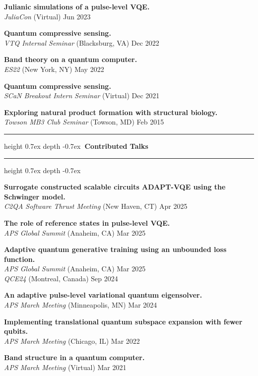 \documentclass[marginmode, 10pt]{res} %
\def\Vhrulefill{\leavevmode\leaders\hrule height 0.7ex depth \dimexpr0.4pt-0.7ex\hfill\kern0pt}         %
\begin{document}
\begin{resume}
\textbf{Julianic simulations of a pulse-level VQE.} \\
    \textit{JuliaCon} (Virtual) \hfill Jun 2023

\textbf{Quantum compressive sensing.} \\
    \textit{VTQ Internal Seminar} (Blacksburg, VA) \hfill Dec 2022

\textbf{Band theory on a quantum computer.} \\
    \textit{ES22} (New York, NY) \hfill May 2022

\textbf{Quantum compressive sensing.} \\
    \textit{SCaN Breakout Intern Seminar} (Virtual) \hfill Dec 2021

\textbf{Exploring natural product formation with structural biology.} \\
    \textit{Towson MB3 Club Seminar} (Towson, MD) \hfill Feb 2015



\Vhrulefill \textbf{~Contributed Talks~} \Vhrulefill

\textbf{Surrogate constructed scalable circuits ADAPT-VQE using the Schwinger model.} \\
    \textit{C2QA Software Thrust Meeting} (New Haven, CT) \hfill Apr 2025

\textbf{The role of reference states in pulse-level VQE.} \\
    \textit{APS Global Summit} (Anaheim, CA) \hfill Mar 2025

\textbf{Adaptive quantum generative training using an unbounded loss function.} \\
    \textit{APS Global Summit} (Anaheim, CA) \hfill Mar 2025 \\
    \textit{QCE24} (Montreal, Canada) \hfill Sep 2024

\textbf{An adaptive pulse-level variational quantum eigensolver.} \\
    \textit{APS March Meeting} (Minneapolis, MN) \hfill Mar 2024

\textbf{Implementing translational quantum subspace expansion with fewer qubits.} \\
    \textit{APS March Meeting} (Chicago, IL) \hfill Mar 2022

\textbf{Band structure in a quantum computer.} \\
    \textit{APS March Meeting} (Virtual) \hfill Mar 2021


\end{resume}
\end{document}
